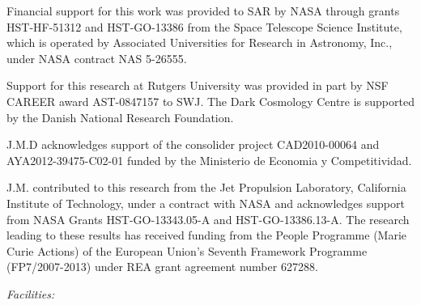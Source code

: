Financial support for this work was provided to SAR by NASA through grants
HST-HF-51312 and HST-GO-13386 from the Space Telescope
Science Institute, which is operated by Associated Universities for
Research in Astronomy, Inc., under NASA contract NAS 5-26555.

Support for this research at Rutgers University was provided in part
by NSF CAREER award AST-0847157 to SWJ.  The Dark Cosmology Centre is
supported by the Danish National Research Foundation.

J.M.D acknowledges support of the consolider project CAD2010-00064 and
AYA2012-39475-C02-01 funded by the Ministerio de Economia y
Competitividad.

J.M. contributed to this research from the Jet Propulsion Laboratory,
California Institute of Technology, under a contract with NASA and
acknowledges support from NASA Grants HST-GO-13343.05-A and
HST-GO-13386.13-A. The research leading to these results has received
funding from the People Programme (Marie Curie Actions) of the European
Union's Seventh Framework Programme (FP7/2007-­2013) under REA grant
agreement number 627288.

{\it Facilities:} 
\smallskip






